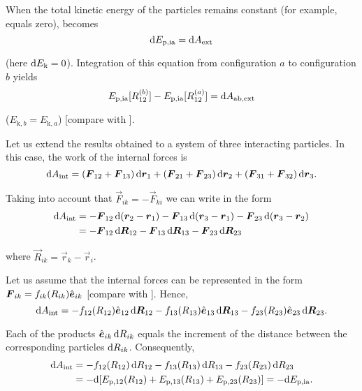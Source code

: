 When the total kinetic energy of the particles remains constant (for example, equals zero),  becomes
\begin{equation}\label{eq:3_52}
\mathrm{d} E_{\text{p,ia}} = \mathrm{d} A_{\text{ext}}
\end{equation}

\noindent
(here $\mathrm{d} E_{\text{k}}=0$). Integration of this equation from configuration $a$ to configuration $b$ yields
\begin{equation}\label{eq:3_53}
E_{\text{p,ia}}[R_{12}^{(b)}] - E_{\text{p,ia}}[R_{12}^{(a)}] = \mathrm{d} A_{\text{ab,ext}}
\end{equation}

\noindent
($E_{\text{k},b}=E_{\text{k},a}$) [compare with ].

Let us extend the results obtained to a system of three interacting particles. In this case, the work of the internal forces is
\begin{equation}\label{eq:3_54}
\mathrm{d} A_{\text{int}} = (\boldsymbol{F}_{12} + \boldsymbol{F}_{13})\,\mathrm{d}\boldsymbol{r}_1 + (\boldsymbol{F}_{21} + \boldsymbol{F}_{23})\,\mathrm{d}\boldsymbol{r}_2 + (\boldsymbol{F}_{31} + \boldsymbol{F}_{32})\,\mathrm{d}\boldsymbol{r}_3.
\end{equation}

\noindent
Taking into account that $\vec{F}_{ik}=-\vec{F}_{ki}$ we can write  in the form
\begin{align}
\mathrm{d} A_{\text{int}} &= - \boldsymbol{F}_{12}\,\mathrm{d}(\boldsymbol{r}_2-\boldsymbol{r}_1) - \boldsymbol{F}_{13}\,\mathrm{d}(\boldsymbol{r}_3-\boldsymbol{r}_1) - \boldsymbol{F}_{23}\,\mathrm{d}(\boldsymbol{r}_3-\boldsymbol{r}_2)\nonumber\\
&= - \boldsymbol{F}_{12}\,\mathrm{d}\boldsymbol{R}_{12} - \boldsymbol{F}_{13}\,\mathrm{d}\boldsymbol{R}_{13} - \boldsymbol{F}_{23}\,\mathrm{d}\boldsymbol{R}_{23}\label{eq:3_55}
\end{align}

\noindent
where $\vec{R}_{ik}=\vec{r}_k-\vec{r}_i$.

Let us assume that the internal forces can be represented in the form $\boldsymbol{F}_{ik}=f_{ik}(R_{ik})\hat{\boldsymbol{e}}_{ik}$ [compare with ]. Hence,
\begin{equation*}
\mathrm{d} A_{\text{int}} = - f_{12}(R_{12})\hat{\boldsymbol{e}}_{12}\,\mathrm{d}\boldsymbol{R}_{12} - f_{13}(R_{13})\hat{\boldsymbol{e}}_{13}\,\mathrm{d}\boldsymbol{R}_{13} - f_{23}(R_{23})\hat{\boldsymbol{e}}_{23}\,\mathrm{d}\boldsymbol{R}_{23}. \end{equation*}

\noindent
Each of the products $\hat{\boldsymbol{e}}_{ik}\,\mathrm{d} R_{ik}$ equals the increment of the distance between the corresponding particles $\mathrm{d} R_{ik}$. Consequently,
\begin{align}
\mathrm{d} A_{\text{int}} &= - f_{12}(R_{12})\,\mathrm{d} R_{12} - f_{13}(R_{13})\,\mathrm{d} R_{13} - f_{23}(R_{23})\,\mathrm{d} R_{23}\nonumber\\
&= - \mathrm{d}[E_{\text{p},12}(R_{12}) + E_{\text{p},13}(R_{13}) + E_{\text{p},23}(R_{23})] = - \mathrm{d} E_{\text{p,ia}}.\label{eq:3_56}
\end{align}


